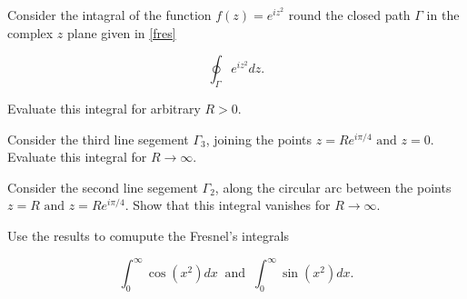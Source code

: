 \documentclass[english,a4paper,12pt]{report}
\begin{document}
{Consider the intagral of the function \(f(z) = e^{iz^2} \) round the closed path \(\Gamma \) in the complex \(z\) plane given in \cref{fres} 

\begin{equation}
    \oint_{\Gamma } e^{iz^2}dz.  
\end{equation}

Evaluate this integral for arbitrary \(R > 0\).

Consider the third line segement \(\Gamma _{3} \), joining the points \(z = Re^{i \pi /4} \text { and } z = 0\). Evaluate this integral for \(R \to \infty\).

Consider the second line segement \(\Gamma _{2} \), along the circular arc between the points \(z = R \text { and } z = Re^{i \pi /4} \). Show that this integral vanishes for \(R \to \infty\).

Use the results to comupute the Fresnel's integrals

\begin{equation}
    \int_{0}^{\infty} \cos (x^2)dx ~\text { and }~ \int_{0}^{\infty} \sin (x^2)dx.    
\end{equation}
~
}
\end{document}
